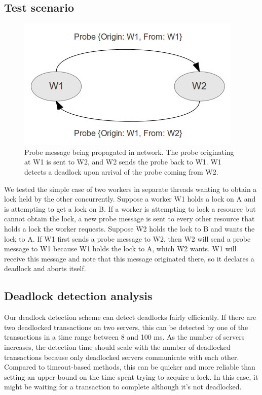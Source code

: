 \documentclass[a4paper, 10pt, notitlepage]{article}
\begin{document}
\subsection{Test scenario}
\begin{figure}[h!]

  \centering
    \includegraphics[scale=0.9]{deadlock-message.png}
  \caption{Probe message being propagated in network. The probe originating at W1 is sent to W2, and W2 sends the probe back to W1. W1 detects a deadlock upon arrival of the probe coming from W2.}
\end{figure}

We tested the simple case of two workers in separate threads wanting to obtain a lock held by the other concurrently. Suppose a worker W1 holds a lock on A and is attempting to get a lock on B. If a worker is attempting to lock a resource but cannot obtain the lock, a new probe message is sent to every other resource that holds a lock the worker requests. Suppose W2 holds the lock to B and wants the lock to A. If W1 first sends a probe message to W2, then W2 will send a probe message to W1 because W1 holds the lock to A, which W2 wants. W1 will receive this message and note that this message originated there, so it declares a deadlock and aborts itself.

\subsection{Deadlock detection analysis}
Our deadlock detection scheme can detect deadlocks fairly efficiently. If there are two deadlocked transactions on two servers, this can be detected by one of the transactions in a time range between 8 and 100 ms. As the number of servers increases, the detection time should scale with the number of deadlocked transactions because only deadlocked servers communicate with each other. Compared to timeout-based methods, this can be quicker and more reliable than setting an upper bound on the time spent trying to acquire a lock. In this case, it might be waiting for a transaction to complete although it's not deadlocked.
\end{document}
